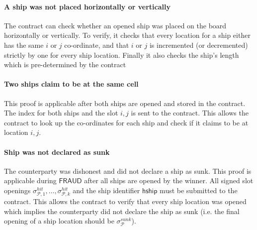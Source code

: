 \documentclass{llncs}
\newcommand{\gamefraud}{\mathsf{FRAUD}}
\newcommand{\hship}{\mathsf{hship}}
\newcommand{\participant}{\mathcal{P}}
\begin{document}

\paragraph{A ship was not placed  horizontally or vertically}
The contract can check whether an opened ship was placed on the board horizontally or vertically. 
To verify, it checks that every location for a ship either has the same $i$ or $j$ co-ordinate, and that $i$ or $j$ is incremented (or decremented) strictly by one for every ship location. 
Finally it also checks the ship's length which is pre-determined by the contract

\paragraph{Two ships claim to be at  the same cell} 
This proof is applicable after both ships are opened and stored in the contract. 
The index for both ships and the slot $i,j$ is sent to the contract.
This allows the contract to look up the co-ordinates for each ship and check if it claims to be at location $i,j$. 

\paragraph{Ship was not declared as sunk}
The counterparty was dishonest and did not declare a ship as sunk. 
This proof is applicable during $\gamefraud$ after all ships are opened by the winner. 
All signed slot openings $\sigma^{hit}_{\participant,1},...,\sigma^{hit}_{\participant,k}$ and the ship identifier $\hship$ must be submitted to the contract.
This allows the contract to verify that every ship location was opened which implies the counterparty did not declare the ship as sunk (i.e. the final opening of a ship location should be $\sigma^{sunk}_{\participant}$). 
\end{document}
